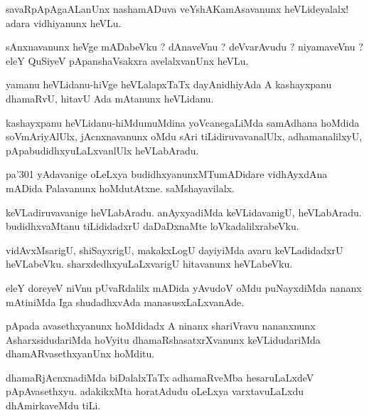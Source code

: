 \documentclass{article}
\begin{document}
\begin{mn}%
savaRpApAgaALanUnx nashamADuva veYshAKamAsavanunx heVLideyalalx! adara  vidhiyanunx heVLu.
\end{mn}

\begin{mn}%
sAnxnavanunx heVge mADabeVku ? dAnaveVnu ? deVvarAvudu ? niyamaveVnu ? eleY QuSiyeV 
pApanshaVsakxra avelalxvanUnx heVLu.
\end{mn}

\begin{mn}%
yamanu heVLidanu-hiVge heVLalapxTaTx dayAnidhiyAda A kashayxpanu dhamaRvU, hitavU Ada 
mAtanunx heVLidanu.
\end{mn}

\begin{mn}%
kashayxpanu heVLidanu-hiMdumuMdina yoVcanegaLiMda samAdhana hoMdida soVmAriyAlUlx, 
jAcnxnavanunx oMdu sAri  tiLidiruvavanalUlx, adhamanalilxyU, pApabudidhxyuLaLxvanlUlx 
heVLabAradu.
\end{mn}

\begin{mn}%
pa\char'301 yAdavanige oLeLxya budidhxyanunxMTumADidare vidhAyxdAna mADida Palavanunx 
hoMdutAtxne. saMshayavilalx.
\end{mn}

\begin{mn}%
keVLadiruvavanige heVLabAradu. anAyxyadiMda keVLidavanigU, heVLabAradu. budidhxvaMtanu 
tiLididadxrU daDaDxnaMte loVkadalilxrabeVku.
\end{mn}

\begin{mn}%
vidAvxMsarigU, shiSayxrigU, makakxLogU dayiyiMda avaru keVLadidadxrU heVLabeVku. 
sharxdedhxyuLaLxvarigU hitavanunx heVLabeVku.
\end{mn}

\begin{mn}%
eleY doreyeV niVnu pUvaRdalilx mADida yAvudoV oMdu puNayxdiMda nananx mAtiniMda Iga 
shudadhxvAda manasusxLaLxvanAde.
\end{mn}

\begin{mn}%
pApada avasethxyanunx hoMdidadx A ninanx shariVravu nananxnunx AsharxsidudariMda hoVyitu 
dhamaRshasatxrXvanunx keVLidudariMda dhamARvasethxyanUnx hoMditu.
\end{mn}

\begin{mn}%
dhamaRjAcnxnadiMda biDalalxTaTx adhamaRveMba hesaruLaLxdeV pApAvasethxyu. adakikxMta 
horatAdudu oLeLxya varxtavuLaLxdu dhAmirkaveMdu tiLi.
\end{mn}
\end{document}
